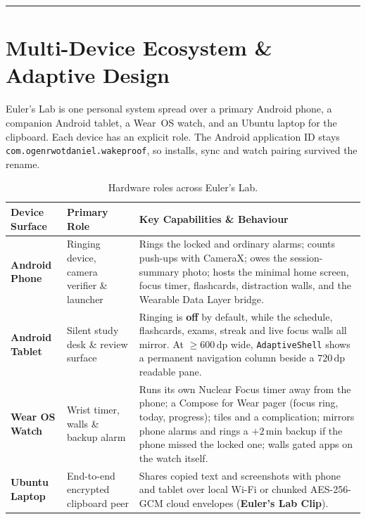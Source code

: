 \documentclass[11pt,a4paper]{article}
\begin{document}
\newpage
\tableofcontents
\vspace{8pt}
{\color{wpborder}\hrule height 0.8pt}

\section{Multi-Device Ecosystem \& Adaptive Design}

Euler's Lab is one personal system spread over a primary Android phone, a companion Android tablet, a Wear~OS watch, and an Ubuntu laptop for the clipboard. Each device has an explicit role. The Android application ID stays \texttt{com.ogenrwotdaniel.wakeproof}, so installs, sync and watch pairing survived the rename.

\begin{table}[H]
\centering
\small
\begin{tabularx}{\textwidth}{@{}L{3.1cm}L{3.3cm}Y@{}}
\toprule
\textbf{\sffamily Device Surface} & \textbf{\sffamily Primary Role} & \textbf{\sffamily Key Capabilities \& Behaviour} \\
\midrule
\textbf{Android Phone}  &
Ringing device, camera verifier \& launcher &
Rings the locked and ordinary alarms; counts push-ups with CameraX; owes the session-summary photo; hosts the minimal home screen, focus timer, flashcards, distraction walls, and the Wearable Data Layer bridge. \\
\addlinespace[4pt]
\textbf{Android Tablet}  &
Silent study desk \& review surface &
Ringing is \textbf{off} by default, while the schedule, flashcards, exams, streak and live focus walls all mirror. At $\ge 600\,\text{dp}$ wide, \texttt{AdaptiveShell} shows a permanent navigation column beside a $720\,\text{dp}$ readable pane. \\
\addlinespace[4pt]
\textbf{Wear OS Watch}  &
Wrist timer, walls \& backup alarm &
Runs its own Nuclear Focus timer away from the phone; a Compose for Wear pager (focus ring, today, progress); tiles and a complication; mirrors phone alarms and rings a $+2\,\text{min}$ backup if the phone missed the locked one; walls gated apps on the watch itself. \\
\addlinespace[4pt]
\textbf{Ubuntu Laptop}  &
End-to-end encrypted clipboard peer &
Shares copied text and screenshots with phone and tablet over local Wi-Fi or chunked AES-256-GCM cloud envelopes (\textbf{Euler's Lab Clip}). \\
\bottomrule
\end{tabularx}
\caption{Hardware roles across Euler's Lab.}
\end{table}
\end{document}
